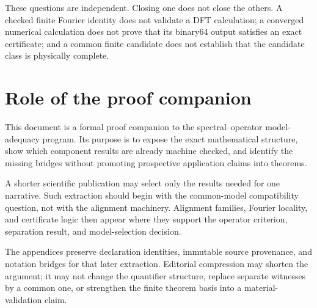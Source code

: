 These questions are independent.  Closing one does not close the others.  A checked
finite Fourier identity does not validate a DFT calculation; a converged numerical
calculation does not prove that its binary64 output satisfies an exact certificate; and
a common finite candidate does not establish that the candidate class is physically
complete.

\section{Role of the proof companion}

This document is a formal proof companion to the spectral--operator model-adequacy
program.  Its purpose is to expose the exact mathematical structure, show which
component results are already machine checked, and identify the missing bridges without
promoting prospective application claims into theorems.

A shorter scientific publication may select only the results needed for one narrative.
Such extraction should begin with the common-model compatibility question, not with the
alignment machinery.  Alignment families, Fourier locality, and certificate logic then
appear where they support the operator criterion, separation result, and model-selection
decision.

The appendices preserve declaration identities, immutable source provenance, and
notation bridges for that later extraction.  Editorial compression may shorten the
argument; it may not change the quantifier structure, replace separate witnesses by a
common one, or strengthen the finite theorem basis into a material-validation claim.
